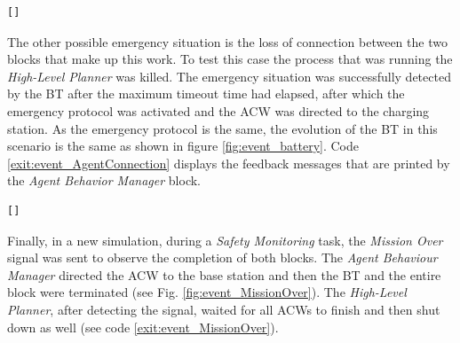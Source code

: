 \begin{lstlisting}[caption={Printed feedback messages after enough battery communication}, breaklines=true, label=exit:event_batteryOK]
	[]
\end{lstlisting}

The other possible emergency situation is the loss of connection between the two blocks that make up this work. To test this case the process that was running the \emph{High-Level Planner} was killed. The emergency situation was successfully detected by the \gls{BT} after the maximum timeout time had elapsed, after which the emergency protocol was activated and the \gls{ACW} was directed to the charging station. As the emergency protocol is the same, the evolution of the \gls{BT} in this scenario is the same as shown in figure \ref{fig:event_battery}. Code \ref{exit:event_AgentConnection} displays the feedback messages that are printed by the \emph{Agent Behavior Manager} block.

\begin{lstlisting}[caption={Feedback messages printed by \emph{Agent Behavior Manager} block after a connection loss}, breaklines=true, label=exit:event_AgentConnection]
	[]
\end{lstlisting}

Finally, in a new simulation, during a \emph{Safety Monitoring} task, the \emph{Mission Over} signal was sent to observe the completion of both blocks. The \emph{Agent Behaviour Manager} directed the \gls{ACW} to the base station and then the \gls{BT} and the entire block were terminated (see Fig. \ref{fig:event_MissionOver}). The \emph{High-Level Planner}, after detecting the signal, waited for all \glspl{ACW} to finish and then shut down as well (see code \ref{exit:event_MissionOver}).

